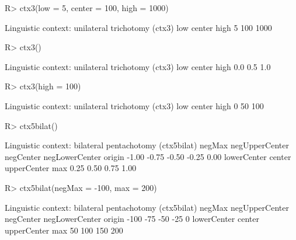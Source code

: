 \begin{Schunk}
% --begin: "ctx"
\begin{Sinput}
R> ctx3(low = 5, center = 100, high = 1000)
\end{Sinput}
\begin{Soutput}
Linguistic context: unilateral trichotomy (ctx3)
   low center   high 
     5    100   1000 
\end{Soutput}
\begin{Sinput}
R> ctx3()
\end{Sinput}
\begin{Soutput}
Linguistic context: unilateral trichotomy (ctx3)
   low center   high 
   0.0    0.5    1.0 
\end{Soutput}
\begin{Sinput}
R> ctx3(high = 100)
\end{Sinput}
\begin{Soutput}
Linguistic context: unilateral trichotomy (ctx3)
   low center   high 
     0     50    100 
\end{Soutput}
\begin{Sinput}
R> ctx5bilat()
\end{Sinput}
\begin{Soutput}
Linguistic context: bilateral pentachotomy (ctx5bilat)
        negMax negUpperCenter      negCenter negLowerCenter         origin 
         -1.00          -0.75          -0.50          -0.25           0.00 
   lowerCenter         center    upperCenter            max 
          0.25           0.50           0.75           1.00 
\end{Soutput}
\begin{Sinput}
R> ctx5bilat(negMax = -100, max = 200)
\end{Sinput}
\begin{Soutput}
Linguistic context: bilateral pentachotomy (ctx5bilat)
        negMax negUpperCenter      negCenter negLowerCenter         origin 
          -100            -75            -50            -25              0 
   lowerCenter         center    upperCenter            max 
            50            100            150            200 
\end{Soutput}
%
% --end: "ctx"
\end{Schunk}
